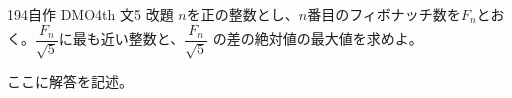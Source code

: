 \begin{thm}{194}{}{自作 DMO4th 文5 改題}
 $n$を正の整数とし、$n$番目のフィボナッチ数を$F_n$とおく。$\dfrac{F_n}{\sqrt{5}}$に最も近い整数と、$\dfrac{F_n}{\sqrt{5}}$ の差の絶対値の最大値を求めよ。
\end{thm}

ここに解答を記述。